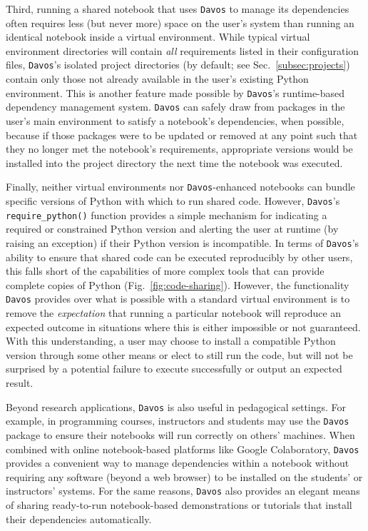 \documentclass[preprint,12pt,a4paper]{elsarticle}
\begin{document}
Third, running a shared notebook that uses \texttt{Davos} to manage its dependencies often requires less (but never more) space on the user's system than running an identical notebook inside a virtual environment.
While typical virtual environment directories will contain \textit{all} requirements listed in their configuration files, \texttt{Davos}'s isolated project directories (by default; see Sec.~\ref{subsec:projects}) contain only those not already available in the user's existing Python environment.
This is another feature made possible by \texttt{Davos}'s runtime-based dependency management system.
\texttt{Davos} can safely draw from packages in the user's main environment to satisfy a notebook's dependencies, when possible, because if those packages were to be updated or removed at any point such that they no longer met the notebook's requirements, appropriate versions would be installed into the project directory the next time the notebook was executed.

Finally, neither virtual environments nor \texttt{Davos}-enhanced notebooks can bundle specific versions of Python with which to run shared code.
However, \texttt{Davos}'s \texttt{require\_\-python()} function provides a simple mechanism for indicating a required or constrained Python version and alerting the user at runtime (by raising an exception) if their Python version is incompatible.
In terms of \texttt{Davos}'s ability to ensure that shared code can be executed reproducibly by other users, this falls short of the capabilities of more complex tools that can provide complete copies of Python (Fig.~\ref{fig:code-sharing}).
However, the functionality \texttt{Davos} provides over what is possible with a standard virtual environment is to remove the \textit{expectation} that running a particular notebook will reproduce an expected outcome in situations where this is either impossible or not guaranteed.
With this understanding, a user may choose to install a compatible Python version through some other means or elect to still run the code, but will not be surprised by a potential failure to execute successfully or output an expected result.

Beyond research applications, \texttt{Davos} is also useful in
pedagogical settings. For example, in programming courses, instructors
and students may use the \texttt{Davos} package to ensure their
notebooks will run correctly on others' machines. When combined with
online notebook-based platforms like Google Colaboratory,
\texttt{Davos} provides a convenient way to manage dependencies within
a notebook without requiring any software (beyond a web browser) to
be installed on the students' or instructors' systems. For the same
reasons, \texttt{Davos} also provides an elegant means of sharing
ready-to-run notebook-based demonstrations or tutorials that install
their dependencies automatically.
\end{document}
